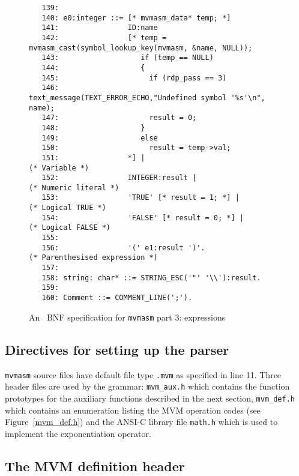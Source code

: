 \begin{figure}
\begin{minipage}{30cm}
\begin{verbatim}
   139: 
   140: e0:integer ::= [* mvmasm_data* temp; *]
   141:                ID:name
   142:                [* temp = mvmasm_cast(symbol_lookup_key(mvmasm, &name, NULL));
   143:                   if (temp == NULL)
   144:                   {
   145:                     if (rdp_pass == 3)
   146:                       text_message(TEXT_ERROR_ECHO,"Undefined symbol '%s'\n", name);
   147:                     result = 0;
   148:                   }
   149:                   else
   150:                     result = temp->val;
   151:                *] |                                                        (* Variable *)
   152:                INTEGER:result |                                            (* Numeric literal *)
   153:                'TRUE' [* result = 1; *] |                                  (* Logical TRUE *)
   154:                'FALSE' [* result = 0; *] |                                 (* Logical FALSE *)
   155: 
   156:                '(' e1:result ')'.                                          (* Parenthesised expression *)
   157: 
   158: string: char* ::= STRING_ESC('"' '\\'):result.
   159: 
   160: Comment ::= COMMENT_LINE(';').
\end{verbatim}
\end{minipage}
\caption{An \rdp\ BNF specification for {\tt mvmasm} part 3: expressions}
\label{mvmasm:bnf3}
\end{figure}

\subsection{Directives for setting up the parser}

{\tt mvmasm} source files have default file type {\tt .mvm} as specified
in line 11.  Three header files are used by the grammar:
\verb+mvm_aux.h+ which contains  the function prototypes for the
auxiliary functions described in the next section, \verb+mvm_def.h+ 
which contains an enumeration listing the MVM operation codes (see
Figure~\ref{mvm_def.h}) and the ANSI-C library file \verb+math.h+ which
is used to implement the exponentiation operator.

\subsection{The MVM definition header}

